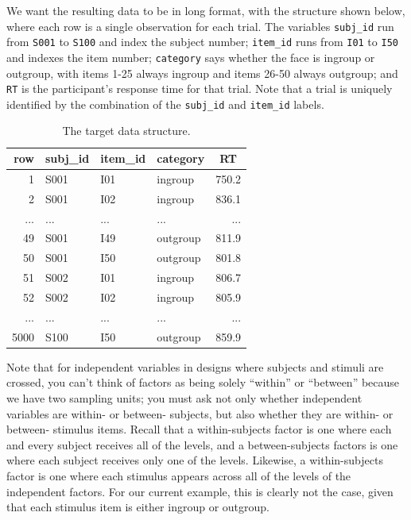 \documentclass[man,floatsintext]{apa6}
\begin{document}
We want the resulting data to be in long format, with the structure shown below, where each row is a single observation for each trial. The variables \texttt{subj\_id} run from \texttt{S001} to \texttt{S100} and index the subject number; \texttt{item\_id} runs from \texttt{I01} to \texttt{I50} and indexes the item number; \texttt{category} says whether the face is ingroup or outgroup, with items 1-25 always ingroup and items 26-50 always outgroup; and \texttt{RT} is the participant's response time for that trial. Note that a trial is uniquely identified by the combination of the \texttt{subj\_id} and \texttt{item\_id} labels.

\begin{table}[H]
\begin{center}
\begin{threeparttable}
\caption{\label{tab:data-example}The target data structure.}
\begin{tabular}{rlllr}
\toprule
row & \multicolumn{1}{c}{subj\_id} & \multicolumn{1}{c}{item\_id} & \multicolumn{1}{c}{category} & \multicolumn{1}{c}{RT}\\
\midrule
1 & S001 & I01 & ingroup & 750.2\\
2 & S001 & I02 & ingroup & 836.1\\
... & ... & ... & ... & ...\\
49 & S001 & I49 & outgroup & 811.9\\
50 & S001 & I50 & outgroup & 801.8\\
51 & S002 & I01 & ingroup & 806.7\\
52 & S002 & I02 & ingroup & 805.9\\
... & ... & ... & ... & ...\\
5000 & S100 & I50 & outgroup & 859.9\\
\bottomrule
\end{tabular}
\end{threeparttable}
\end{center}
\end{table}

Note that for independent variables in designs where subjects and stimuli are crossed, you can't think of factors as being solely \enquote{within} or \enquote{between} because we have two sampling units; you must ask not only whether independent variables are within- or between- subjects, but also whether they are within- or between- stimulus items. Recall that a within-subjects factor is one where each and every subject receives all of the levels, and a between-subjects factors is one where each subject receives only one of the levels. Likewise, a within-subjects factor is one where each stimulus appears across all of the levels of the independent factors. For our current example, this is clearly not the case, given that each stimulus item is either ingroup or outgroup.
\end{document}
